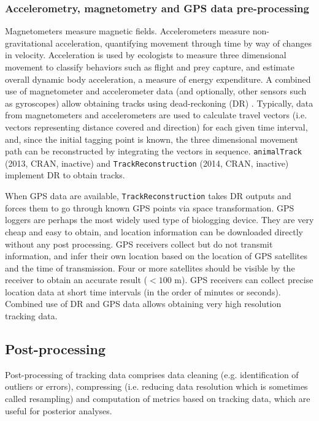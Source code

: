 \documentclass[a4paper,12pt]{article}
\newcommand{\Rpkg}[1]{\texttt{#1}}
\begin{document}
\subsubsection*{Accelerometry, magnetometry and GPS data pre-processing} 

Magnetometers measure magnetic fields. Accelerometers measure non-gravitational acceleration, quantifying movement through time by way of changes in velocity. Acceleration is used by ecologists to measure three dimensional movement to classify behaviors such as flight and prey capture, and estimate overall dynamic body acceleration, a measure of energy expenditure. A combined use of magnetometer and accelerometer data (and optionally, other sensors such as gyroscopes) allow obtaining tracks using dead-reckoning (DR) \citep{Wilson2007,Bidder2015,Williams2017}. Typically, data from magnetometers and accelerometers are used to calculate travel vectors (i.e. vectors representing distance covered and direction) for each given time interval, and, since the initial tagging point is known, the three dimensional movement path can be reconstructed by integrating the vectors in sequence. \Rpkg{animalTrack} (2013, CRAN, inactive) and \Rpkg{TrackReconstruction} (2014, CRAN, inactive) implement DR to obtain tracks.

When GPS data are available, \Rpkg{TrackReconstruction} takes DR outputs and forces them to go through known GPS points via space transformation. 
GPS loggers are perhaps the most widely used type of biologging device. They are very cheap and easy to obtain, and location information can be downloaded directly without any post processing. GPS receivers collect but do not transmit information, and infer their own location based on the location of GPS satellites and the time of transmission. Four or more satellites should be visible by the receiver to obtain an accurate result ($<100$ m). GPS receivers can collect precise location data at short time intervals (in the order of minutes or seconds). Combined use of DR and GPS data allows obtaining very high resolution tracking data. 

\subsection*{Post-processing}

Post-processing of tracking data comprises data cleaning (e.g. identification of outliers or errors), compressing (i.e. reducing data resolution which is sometimes called resampling) and computation of metrics based on tracking data, which are useful for posterior analyses.
\end{document}

